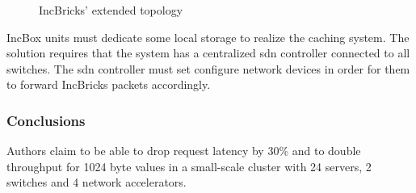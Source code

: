 \begin{figure}[!htb]
    \centering
    \usebox{\incbricksextended}
    \caption{IncBricks' \texorpdfstring{\cite{incbricks}}{} extended topology}
\end{figure}

IncBox units must dedicate some local storage to realize the caching system.
The solution requires that the system has a centralized \gls{sdn} controller connected to all switches.
The \gls{sdn} controller must set configure network devices in order for them to forward IncBricks \cite{incbricks} packets accordingly.

\subsubsection{Conclusions}
Authors claim to be able to drop request latency by 30\% and to double throughput for 1024 byte values in a small-scale cluster with 24 servers, 2 switches and 4 network accelerators.